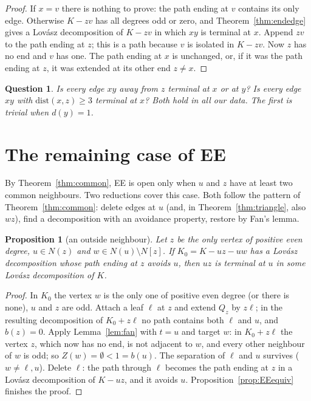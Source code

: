 \documentclass[11pt]{amsart}
\newtheorem{proposition}[theorem]{Proposition}
\newtheorem{question}[theorem]{Question}
\theoremstyle{definition}
\begin{document}
\begin{proof}
If $x=v$ there is nothing to prove: the path ending at $v$ contains its only edge. Otherwise $K-zv$
has all degrees odd or zero, and Theorem~\ref{thm:endedge} gives a Lov\'asz decomposition of $K-zv$
in which $xy$ is terminal at $x$. Append $zv$ to the path ending at $z$; this is a path because $v$ is
isolated in $K-zv$. Now $z$ has no end and $v$ has one. The path ending at $x$ is unchanged, or, if
it was the path ending at $z$, it was extended at its other end $z\ne x$.
\end{proof}

\begin{question}\label{q:away}
Is every edge $xy$ away from $z$ terminal at $x$ or at $y$? Is every edge $xy$ with
$\mathrm{dist}(x,z)\ge3$ terminal at $x$? Both hold in all our data. The first is trivial when $d(y)=1$.
\end{question}

\section{The remaining case of EE}\label{sec:rest}

By Theorem~\ref{thm:common}, EE is open only when $u$ and $z$ have at least two common neighbours. Two
reductions cover this case. Both follow the pattern of Theorem~\ref{thm:common}: delete edges at $u$
(and, in Theorem~\ref{thm:triangle}, also $wz$), find a decomposition with an avoidance property,
restore by Fan's lemma.

\begin{proposition}[an outside neighbour]\label{prop:moveA}
Let $z$ be the only vertex of positive even degree, $u\in N(z)$ and $w\in N(u)\setminus N[z]$. If
$K_0=K-uz-uw$ has a Lov\'asz decomposition whose path ending at $z$ avoids $u$, then $uz$ is terminal
at $u$ in some Lov\'asz decomposition of $K$.
\end{proposition}

\begin{proof}
In $K_0$ the vertex $w$ is the only one of positive even degree (or there is none), $u$ and $z$ are odd.
Attach a leaf $\ell$ at $z$ and extend $Q_z$ by $z\ell$; in the resulting decomposition of $K_0+z\ell$
no path contains both $\ell$ and $u$, and $b(z)=0$. Apply Lemma~\ref{lem:fan} with $t=u$ and target $w$:
in $K_0+z\ell$ the vertex $z$, which now has no end, is not adjacent to $w$, and every other neighbour of
$w$ is odd; so $Z(w)=\emptyset<1=b(u)$. The separation of $\ell$ and $u$ survives ($w\ne\ell,u$).
Delete $\ell$: the path through $\ell$ becomes the path ending at $z$ in a Lov\'asz decomposition of
$K-uz$, and it avoids $u$. Proposition~\ref{prop:EEequiv} finishes the proof.
\end{proof}
\end{document}
